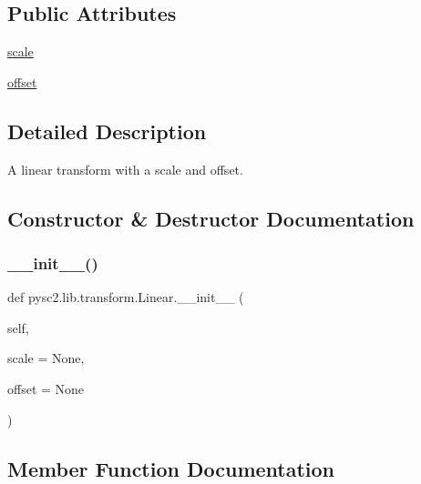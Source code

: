 \subsection*{Public Attributes}
\begin{DoxyCompactItemize}
\item 
\mbox{\hyperlink{classpysc2_1_1lib_1_1transform_1_1_linear_ab3878c47278f90e9b5356776e73b517b}{scale}}
\item 
\mbox{\hyperlink{classpysc2_1_1lib_1_1transform_1_1_linear_a01c3b2d7fafe75ff24327c57e3a684c9}{offset}}
\end{DoxyCompactItemize}


\subsection{Detailed Description}
\begin{DoxyVerb}A linear transform with a scale and offset.\end{DoxyVerb}
 

\subsection{Constructor \& Destructor Documentation}
\mbox{\label{classpysc2_1_1lib_1_1transform_1_1_linear_a06a44d88ea3290ac1e9322188bfe3467}} 
\subsubsection{\texorpdfstring{\+\_\+\+\_\+init\+\_\+\+\_\+()}{\_\_init\_\_()}}
{\footnotesize\ttfamily def pysc2.\+lib.\+transform.\+Linear.\+\_\+\+\_\+init\+\_\+\+\_\+ (\begin{DoxyParamCaption}\item[{}]{self,  }\item[{}]{scale = {\ttfamily None},  }\item[{}]{offset = {\ttfamily None} }\end{DoxyParamCaption})}



\subsection{Member Function Documentation}
\mbox{\label{classpysc2_1_1lib_1_1transform_1_1_linear_a9c94d0303ddc2067febe43ba4ed58192}} 
